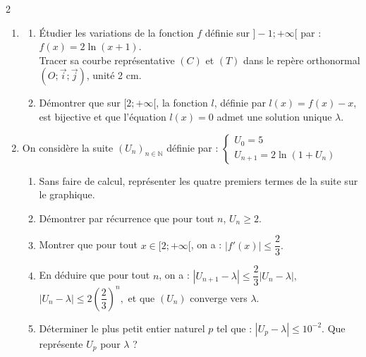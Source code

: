 \documentclass[12pt,a4paper]{article}
\begin{document}
\begin{multicols}{2}
\begin{enumerate}
    \item 
    \begin{enumerate}
        \item Étudier les variations de la fonction \( f \) définie sur \( ]-1 ; +\infty[ \) par : \( f(x) = 2 \ln(x + 1) \).\\
        Tracer sa courbe représentative \( (C) \) et \( (T) \) dans le repère orthonormal \( (O ; \vec{i} ; \vec{j}) \), unité 2 cm.

        \item Démontrer que sur \( [2 ; +\infty[ \), la fonction \( l \), définie par \( l(x) = f(x) - x \), est bijective et que l’équation \( l(x) = 0 \) admet une solution unique \( \lambda \).
    \end{enumerate}

    \item On considère la suite \( (U_n)_{n \in \mathbb{N}} \) définie par :
    \(
    \begin{cases}
    U_0 = 5 \\
    U_{n+1} = 2 \ln(1 + U_n)
    \end{cases}
    \)

    \begin{enumerate}
        \item Sans faire de calcul, représenter les quatre premiers termes de la suite sur le graphique.

        \item Démontrer par récurrence que pour tout \( n \), \( U_n \geq 2 \).

        \item Montrer que pour tout \( x \in [2 ; +\infty[ \), on a :
        \(
        |f'(x)| \leq \dfrac{2}{3}.
        \)

        \item En déduire que pour tout \( n \), on a :
        \(
        |U_{n+1} - \lambda| \leq \dfrac{2}{3} |U_n - \lambda|,
        \)
        \(
        |U_n - \lambda| \leq 2 \left( \dfrac{2}{3} \right)^n,
        \)
        et que \( (U_n) \) converge vers \( \lambda \).

        \item Déterminer le plus petit entier naturel \( p \) tel que :
        \(
        |U_p - \lambda| \leq 10^{-2}.
        \)
        Que représente \( U_p \) pour \( \lambda \) ?
    \end{enumerate}
\end{enumerate}


\end{multicols}
\end{document}
